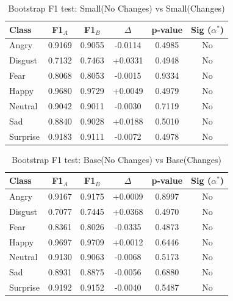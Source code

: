 \begin{table}[H]
\centering
\caption{Bootstrap F1 test: Small(No Changes) vs Small(Changes)}
\label{tab:bootstrap_f1_class_pairs_small}
\begin{tabular}{lccccc}
\hline
Class & F1$_A$ & F1$_B$ & $\Delta$ & p-value & Sig ($\alpha^*$) \\
\hline
Angry    & 0.9169 & 0.9055 & -0.0114 & 0.4985 & No \\
Disgust  & 0.7132 & 0.7463 & +0.0331 & 0.4948 & No \\
Fear     & 0.8068 & 0.8053 & -0.0015 & 0.9334 & No \\
Happy    & 0.9680 & 0.9729 & +0.0049 & 0.4979 & No \\
Neutral  & 0.9042 & 0.9011 & -0.0030 & 0.7119 & No \\
Sad      & 0.8840 & 0.9028 & +0.0188 & 0.5010 & No \\
Surprise & 0.9183 & 0.9111 & -0.0072 & 0.4978 & No \\
\end{tabular}
\end{table}



\begin{table}[H]
\centering
\caption{Bootstrap F1 test: Base(No Changes) vs Base(Changes)}
\label{tab:bootstrap_f1_class_pairs_base}
\begin{tabular}{lccccc}
\hline
Class & F1$_A$ & F1$_B$ & $\Delta$ & p-value & Sig ($\alpha^*$) \\
\hline
Angry    & 0.9167 & 0.9175 & +0.0009 & 0.8997 & No \\
Disgust  & 0.7077 & 0.7445 & +0.0368 & 0.4970 & No \\
Fear     & 0.8361 & 0.8026 & -0.0335 & 0.4873 & No \\
Happy    & 0.9697 & 0.9709 & +0.0012 & 0.6446 & No \\
Neutral  & 0.9130 & 0.9063 & -0.0068 & 0.5173 & No \\
Sad      & 0.8931 & 0.8875 & -0.0056 & 0.6880 & No \\
Surprise & 0.9192 & 0.9152 & -0.0040 & 0.5487 & No \\
\end{tabular}
\end{table}

